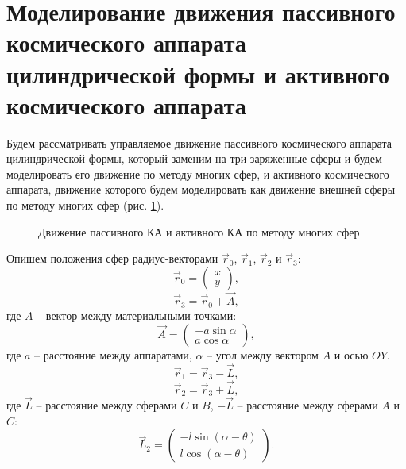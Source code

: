 \section{Моделирование движения пассивного космического аппарата цилиндрической формы и активного космического аппарата}
\label{SEC:2SPH_MSM}

Будем рассматривать управляемое движение пассивного космического аппарата цилиндрической формы, который заменим на три заряженные сферы и будем моделировать его движение по методу многих сфер, и активного космического аппарата, движение которого будем моделировать как движение внешней сферы по методу многих сфер (рис. \ref{ris:2sph_msm}).

\begin{figure}[H]
	\caption{Движение пассивного КА и активного КА по методу многих сфер}
	\label{ris:2sph_msm}
\end{figure}

Опишем положения сфер радиус-векторами $\vec{r}_0$, $\vec{r}_1$, $\vec{r}_2$ и $\vec{r}_3$:
\begin{equation}
\label{eq:2sph_msm_r0}
	\vec{r}_0 = 
	\begin{pmatrix}
		x\\
		y
	\end{pmatrix},
\end{equation}
\begin{equation}
\label{eq:2sph_msm_r3}
	\vec{r}_3 = \vec{r}_0 + \vec{A},
\end{equation}
где $A$ – вектор между материальными точками:
\begin{equation}
\label{eq:2sph_msm_A}
	\vec{A} = 
	\begin{pmatrix}
		- a \sin \alpha \\
		a \cos \alpha
	\end{pmatrix},
\end{equation}
где $a$ – расстояние между аппаратами, $\alpha$ – угол между вектором $A$ и осью $OY$.
\begin{equation}
\label{eq:2sph_msm_r1}
	\vec{r}_1 = \vec{r}_3 - \vec{L},
\end{equation}
\begin{equation}
\label{eq:2sph_msm_r2}
	\vec{r}_2 = \vec{r}_3 + \vec{L},
\end{equation}
где $\vec{L}$ – расстояние между сферами $C$ и $B$, $-\vec{L}$ – расстояние между сферами $A$ и $C$:
\begin{equation}
\label{eq:2sph_msm_L}
	\vec{L}_2 = 
	\begin{pmatrix}
		-l \sin(\alpha - \theta)\\
		l \cos(\alpha - \theta)
	\end{pmatrix}.
\end{equation}

